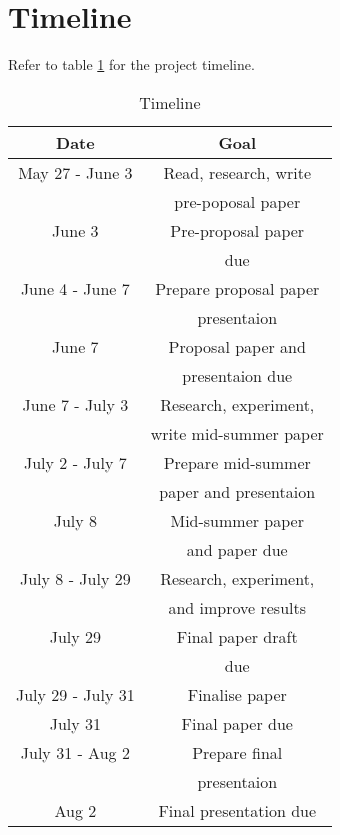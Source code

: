 \section{Timeline}
\label{sec:timeline}

Refer to table \ref{tab:timeline} for the project timeline.

\begin{table}[!ht]
	\centering
	
	\begin{tabular}{|c|c|}
		\hline
		\textbf{Date} & \textbf{Goal} \\
		\hline
		May 27 - June 3 & Read, research, write \\
		& pre-poposal paper \\
		\hline
		June 3 & Pre-proposal paper \\
		& due \\
		\hline
		June 4 - June 7 & Prepare proposal paper \\
		& presentaion \\
		\hline
		June 7 & Proposal paper and \\
		& presentaion due \\
		\hline
		June 7 - July 3 & Research, experiment, \\
		& write mid-summer paper \\
		\hline
		July 2 - July 7 & Prepare mid-summer \\
		& paper and presentaion \\
		\hline
		July 8 & Mid-summer paper \\
		& and paper due \\
		\hline
		July 8 - July 29 & Research, experiment, \\
		& and improve results \\
		\hline
		July 29 & Final paper draft \\
		& due \\
		\hline
		July 29 - July 31 & Finalise paper \\
		\hline
		July 31 & Final paper due \\
		\hline
		July 31 - Aug 2 & Prepare final \\
		& presentaion \\
		\hline
		Aug 2 & Final presentation due \\
		\hline
	\end{tabular}

\caption{Timeline}
\label{tab:timeline}
\end{table}
